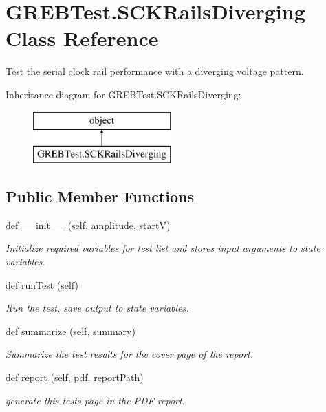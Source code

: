 \hypertarget{class_g_r_e_b_test_1_1_s_c_k_rails_diverging}{}\section{G\+R\+E\+B\+Test.\+S\+C\+K\+Rails\+Diverging Class Reference}
\label{class_g_r_e_b_test_1_1_s_c_k_rails_diverging}


Test the serial clock rail performance with a diverging voltage pattern.  


Inheritance diagram for G\+R\+E\+B\+Test.\+S\+C\+K\+Rails\+Diverging\+:\begin{figure}[H]
\begin{center}
\leavevmode
\includegraphics[height=2.000000cm]{class_g_r_e_b_test_1_1_s_c_k_rails_diverging}
\end{center}
\end{figure}
\subsection*{Public Member Functions}
\begin{DoxyCompactItemize}
\item 
def \hyperlink{class_g_r_e_b_test_1_1_s_c_k_rails_diverging_ac4a6f0e253664bd4e73218ed241b5fdf}{\+\_\+\+\_\+init\+\_\+\+\_\+} (self, amplitude, startV)
\begin{DoxyCompactList}\small\item\em Initialize required variables for test list and stores input arguments to state variables. \end{DoxyCompactList}\item 
def \hyperlink{class_g_r_e_b_test_1_1_s_c_k_rails_diverging_a2013f55e170fd821abd1d7a9daae6ddc}{run\+Test} (self)
\begin{DoxyCompactList}\small\item\em Run the test, save output to state variables. \end{DoxyCompactList}\item 
def \hyperlink{class_g_r_e_b_test_1_1_s_c_k_rails_diverging_abdc5706fe0a88876f573e90b2929fe60}{summarize} (self, summary)
\begin{DoxyCompactList}\small\item\em Summarize the test results for the cover page of the report. \end{DoxyCompactList}\item 
def \hyperlink{class_g_r_e_b_test_1_1_s_c_k_rails_diverging_aaa7437f537fd3aaa532b25d98cf20889}{report} (self, pdf, report\+Path)
\begin{DoxyCompactList}\small\item\em generate this test\textquotesingle{}s page in the P\+DF report. \end{DoxyCompactList}\end{DoxyCompactItemize}


